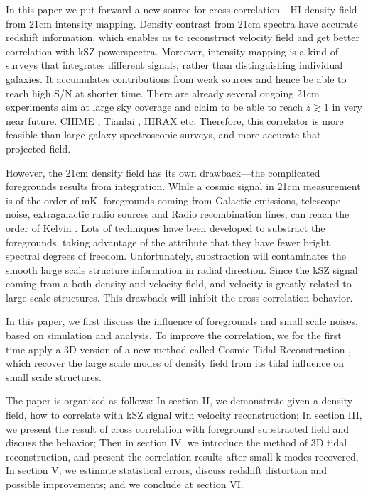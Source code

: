In this paper we put forward a new source for cross correlation---HI density field from 21cm intensity mapping. 
Density contrast from 21cm spectra have accurate redshift information, 
which enables us to reconstruct velocity field and 
get better correlation with kSZ powerspectra. 
Moreover, intensity mapping is a kind of surveys that 
integrates different signals, 
rather than distinguishing individual galaxies. 
It accumulates contributions from weak sources 
and hence be able to reach high S/N at shorter time. 
There are already several ongoing 21cm experiments aim at large sky coverage and claim to be able to reach $z\gtrsim1$ in very near future.
CHIME \cite{2014SPIE.9145E..22B}, Tianlai \cite{2015ApJ...798...40X}, 
HIRAX \cite{HIRAX} etc.
Therefore, this correlator is more feasible than large galaxy spectroscopic surveys, 
and more accurate that projected field.

However, the 21cm density field has its own drawback---the complicated foregrounds results from integration. 
While a cosmic signal in 21cm measurement is of the order of mK,  
foregrounds coming from Galactic emissions, telescope noise, 
extragalactic radio sources and Radio recombination lines, 
can reach the order of Kelvin \cite{DiMatteo04}\cite{Masui13}. 
Lots of techniques have been developed to substract the foregrounds, 
taking advantage of the attribute that they have fewer bright spectral
degrees of freedom\cite{Switzer15}.
Unfortunately, substraction will contaminates the smooth large scale structure information in radial direction.
Since the kSZ signal coming from a both density and velocity field, 
and velocity is greatly related to large scale structures. 
This drawback will inhibit the cross correlation behavior.

In this paper, 
we first discuss the influence of foregrounds and small scale noises, 
based on simulation and analysis. 
To improve the correlation, we for the first time apply a 3D version of a new method called Cosmic Tidal Reconstruction \cite{2012:pen}\cite{2015:zhu}, which recover the large scale modes of density field from its tidal influence on small scale structures. 

The paper is organized as follows: 
In section II, we demonstrate given a density field, how to correlate with kSZ signal with velocity reconstruction; 
In section III, we present the result of cross correlation with foreground substracted field 
and discuss the behavior; 
Then in section IV, we introduce the method of 3D tidal reconstruction, 
and present the correlation results after small k modes recovered, 
In section V, we estimate statistical errors, discuss redshift distortion and possible improvements; 
and we conclude at section VI.

